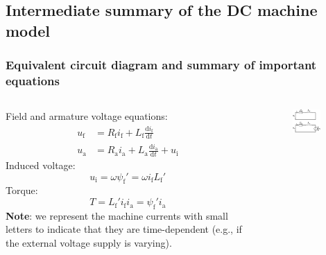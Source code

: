 \subsection{Intermediate summary of the DC machine model}

\begin{frame}
	\frametitle{Equivalent circuit diagram and summary of important equations}
	\begin{columns}
		\begin{column}{0.55\textwidth}
	Field and armature voltage equations:
	\begin{equation}
		\begin{aligned}
			u_\mathrm{f} &= R_\mathrm{f} i_\mathrm{f} + L_\mathrm{f} \frac{\mathrm{d}i_\mathrm{f}}{\mathrm{d}t} \\
			u_\mathrm{a} &= R_\mathrm{a} i_\mathrm{a} + L_\mathrm{a} \frac{\mathrm{d}i_\mathrm{a}}{\mathrm{d}t} + u_\mathrm{i} 
		\end{aligned}
		 \label{eq:DC_machine_ODE_currents}
	\end{equation} \pause
	Induced voltage:
	\begin{equation*}
			u_\mathrm{i} = \omega \psi_\mathrm{f}' = \omega i_\mathrm{f} L_\mathrm{f}' 
	\end{equation*} \pause
	Torque:
	\begin{equation*}
		T =  L_\mathrm{f}' i_\mathrm{f} i_\mathrm{a}  = \psi_\mathrm{f}' i_\mathrm{a}
	\end{equation*} \pause
	\textbf{Note}: we represent the machine currents with small letters to indicate that they are time-dependent (e.g., if the external voltage supply is varying).
\end{column} \pause
\hfill
\begin{column}{0.45\textwidth}
	\begin{figure}
		\centering
		\includegraphics[width=0.8\textwidth]{fig/lec03/ECD_DC_machine.pdf}

\end{figure}
\end{column}
\end{columns}
\end{frame}
